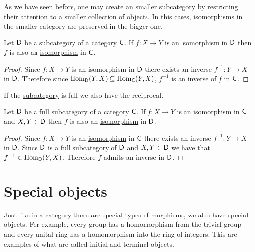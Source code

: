 \documentclass[../../main]{subfiles}
\begin{document}
As we have seen before, one may create an smaller subcategory by restricting their attention to a smaller collection of objects.
In this cases, \hyperref[def:categorical-isomorphism]{isomorphisms} in the smaller category are preserved in the bigger one.
\begin{proposition}
  Let \(\mathsf{D}\) be a \hyperref[def:subcategory]{subcategory} of a \hyperref[def:category]{category} \(\mathsf{C}\).
  If \(f\colon X \to Y\) is an \hyperref[def:categorical-isomorphism]{isomorphism} in \(\mathsf{D}\) then \(f\) is also an \hyperref[def:categorical-isomorphism]{isomorphism} in \(\mathsf{C}\).
\end{proposition}
\begin{proof}
  Since \(f\colon X \to Y\) is an \hyperref[def:categorical-isomorphism]{isomorphism} in \(\mathsf{D}\) there exists an inverse \(f^{-1}\colon Y \to X\) in \(\mathsf{D}\).
  Therefore since \(\operatorname{Hom}_{\mathsf{D}}(Y, X) \subseteq \operatorname{Hom}_{\mathsf{C}}(Y, X)\), \(f^{-1}\) is an inverse of \(f\) in \(\mathsf{C}\).
\end{proof}

If the \hyperref[def:subcategory]{subcategory} is full we also have the reciprocal.
\begin{proposition}\label{prop:full-subcategory-reflects-isomorphisms}
  Let \(\mathsf{D}\) be a \hyperref[def:subcategory]{full subcategory} of a \hyperref[def:category]{category} \(\mathsf{C}\).
  If \(f\colon X \to Y\) is an \hyperref[def:categorical-isomorphism]{isomorphism} in \(\mathsf{C}\) and \(X, Y \in \mathsf{D}\) then \(f\) is also an \hyperref[def:categorical-isomorphism]{isomorphism} in \(\mathsf{D}\).
\end{proposition}
\begin{proof}
  Since \(f\colon X \to Y\) is an \hyperref[def:categorical-isomorphism]{isomorphism} in \(\mathsf{C}\) there exists an inverse \(f^{-1}\colon Y \to X\) in \(\mathsf{D}\).
  Since \(\mathsf{D}\) is a \hyperref[def:subcategory]{full subcategory} of \(\mathsf{D}\) and \(X, Y \in \mathsf{D}\) we have that \(f^{-1} \in \operatorname{Hom}_{\mathsf{D}}(Y, X)\).
  Therefore \(f\) admits an inverse in \(\mathsf{D}\).
\end{proof}

\section{Special objects}

Just like in a category there are special types of morphisms, we also have special objects.
For example, every group has a homomorphism from the trivial group and every unital ring has a homomorphism into the ring of integers.
This are examples of what are called initial and terminal objects.
\end{document}
